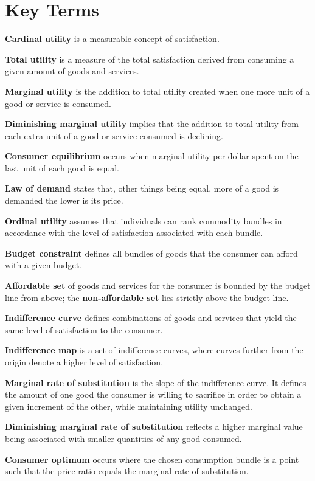 \newpage
	\section*{Key Terms}
\begin{keyterms}
\textbf{Cardinal utility} is a measurable concept of satisfaction.

\textbf{Total utility} is a measure of the total satisfaction derived from consuming a given amount of goods and services.

\textbf{Marginal utility} is the addition to total utility created when one more unit of a good or service is consumed.

\textbf{Diminishing marginal utility} implies that the addition to total utility from each extra unit of a good or service consumed is declining.

\textbf{Consumer equilibrium} occurs when marginal utility per dollar spent on the last unit of each good is equal.

\textbf{Law of demand} states that, other things being equal, more of a good is demanded the lower is its price.

\textbf{Ordinal utility} assumes that individuals can rank commodity bundles in accordance with the level of satisfaction associated with each bundle.

\textbf{Budget constraint} defines all bundles of goods that the consumer can afford with a given budget.

\textbf{Affordable set} of goods and services for the consumer is bounded by the budget line from above; the \textbf{non-affordable set} lies strictly above the budget line.

\textbf{Indifference curve} defines combinations of goods and services that yield the same level of satisfaction to the consumer.

\textbf{Indifference map} is a set of indifference curves, where curves further from the origin denote a higher level of satisfaction.

\textbf{Marginal rate of substitution} is the slope of the indifference curve. It defines the amount of one good the consumer is willing to sacrifice in order to obtain a given increment of the other, while maintaining utility unchanged.

\textbf{Diminishing marginal rate of substitution} reflects a higher marginal value being associated with smaller quantities of any good consumed.

\textbf{Consumer optimum} occurs where the chosen consumption bundle is a point such that the price ratio equals the marginal rate of substitution.
\end{keyterms}